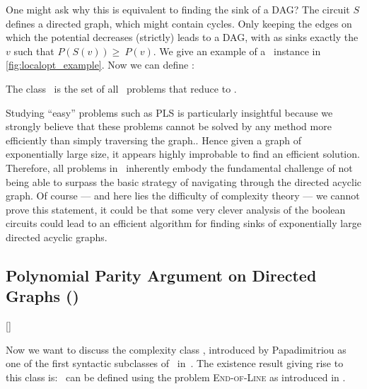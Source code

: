 One might ask why this is equivalent to finding the sink of a DAG\@? The circuit $S$ defines a directed graph, which might contain cycles. Only keeping the edges on which the potential decreases (strictly) leads to a DAG, with as sinks exactly the $v$ such that $P(S(v)) \geq\ P(v)$. We give an example of a \Localopt\ instance in \cref{fig:localopt_example}. Now we can define \PLS:

\begin{definition}
    The class \PLS\ is the set of all \TFNP\ problems that reduce to \Localopt.
\end{definition}

Studying ``easy'' problems such as PLS is particularly insightful because we strongly believe that these problems cannot be solved by any method more efficiently than simply traversing the graph.. Hence given a graph of exponentially large size, it appears highly improbable to find an efficient solution. Therefore, all problems in \PLS\ inherently embody the fundamental challenge of not being able to surpass the basic strategy of navigating through the directed acyclic graph. Of course --- and here lies the difficulty of complexity theory --- we cannot prove this statement, it could be that some very clever analysis of the boolean circuits could lead to an efficient algorithm for finding sinks of exponentially large directed acyclic graphs.

\subsection{Polynomial Parity Argument on Directed Graphs (\PPAD)}[\PPAD]

Now we want to discuss the complexity class \PPAD, introduced by Papadimitriou as one of the first syntactic subclasses of \TFNP\ in~. The existence result giving rise to this class is: 
\PPAD\ can be defined using the problem \textsc{End-of-Line} as introduced in .


